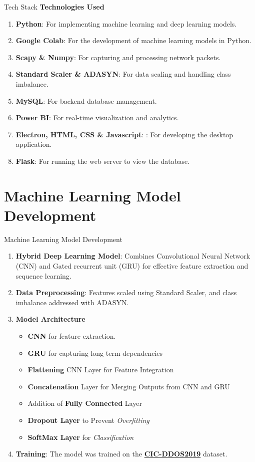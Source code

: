 \documentclass{beamer}
\begin{document}
\begin{frame}{Tech Stack}
\textbf{Technologies Used}
\begin{enumerate}
    \item \textbf{Python}: For implementing machine learning and deep learning models.
    \item \textbf{Google Colab}: For the development of machine learning models in Python.
    \item \textbf{Scapy \& Numpy}: For capturing and processing network packets.
    \item \textbf{Standard Scaler \& ADASYN}: For data scaling and handling class imbalance.
    \item \textbf{MySQL}: For backend database management.
    \item \textbf{Power BI}: For real-time visualization and analytics.
    \item \textbf{Electron, HTML, CSS \& Javascript}: : For developing the desktop application.
    \item \textbf{Flask}: For running the web server to view the database.
\end{enumerate}
\end{frame}

\section{Machine Learning Model Development}

\begin{frame}{Machine Learning Model Development}
\begin{enumerate}
    \item \textbf{Hybrid Deep Learning Model}: Combines Convolutional Neural Network (CNN) and Gated recurrent unit (GRU) for effective feature extraction and sequence learning.
    \item \textbf{Data Preprocessing}: Features scaled using Standard Scaler, and class imbalance addressed with ADASYN.
    \item \textbf{Model Architecture}
    \begin{itemize}
        \item \textbf{CNN} for feature extraction.
        \item \textbf{GRU} for capturing long-term dependencies
        \item \textbf{Flattening} CNN Layer for Feature Integration
        \item \textbf{Concatenation} Layer for Merging Outputs from CNN and GRU
        \item Addition of \textbf{Fully Connected} Layer
        \item \textbf{Dropout Layer} to Prevent \textit{Overfitting}
        \item \textbf{SoftMax Layer} for \textit{Classification}
    \end{itemize}
    \item \textbf{Training}: The model was trained on the \href{https://www.unb.ca/cic/datasets/ddos-2019.html}{\textbf{CIC-DDOS2019}} dataset.
\end{enumerate}
\end{frame}
\end{document}
